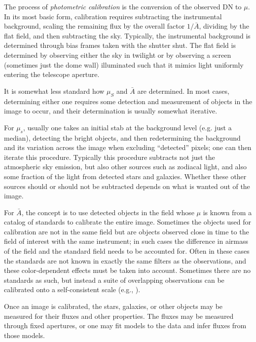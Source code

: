 The process of {\it photometric calibration} is the conversion of the
observed DN to $\mu$. In its most basic form, calibration requires
subtracting the instrumental background, scaling the remaining flux by
the overall factor $1/\bar{A}$, dividing by the flat field, and then
subtracting the sky. Typically, the instrumental background is
determined through bias frames taken with the shutter shut.  The flat
field is determined by observing either the sky in twilight or by
observing a screen (sometimes just the dome wall) illuminated such
that it mimics light uniformly entering the telescope aperture.

It is somewhat less standard how $\mu_S$ and $\bar{A}$ are
determined. In most cases, determining either one requires some
detection and measurement of objects in the image to occur, and their
determination is usually somewhat iterative.

For $\mu_s$, usually one takes an initial stab at the background level
(e.g. just a median), detecting the bright objects, and then
redetermining the background and its variation across the image when
excluding ``detected'' pixels; one can then iterate this
procedure. Typically this procedure subtracts not just the atmospheric
sky emission, but also other sources such as zodiacal light, and also
some fraction of the light from detected stars and galaxies. Whether
these other sources should or should not be subtracted depends on what
is wanted out of the image.

For $\bar{A}$, the concept is to use detected objects in the field
whose $\mu$ is known from a catalog of standards to calibrate the
entire image. Sometimes the objects used for calibration are not in
the same field but are objects observed close in time to the field of
interest with the same instrument; in such cases the difference in
airmass of the field and the standard field needs to be accounted
for. Often in these cases the standards are not known in exactly the
same filters as the observations, and these color-dependent effects
must be taken into account. Sometimes there are no standards as such,
but instead a suite of overlapping observations can be calibrated onto
a self-consistent scale (e.g., \citealt{finkbeiner15a}).

Once an image is calibrated, the stars, galaxies, or other objects may
be measured for their fluxes and other properties. The fluxes may be
measured through fixed apertures, or one may fit models to the data
and infer fluxes from those models.

